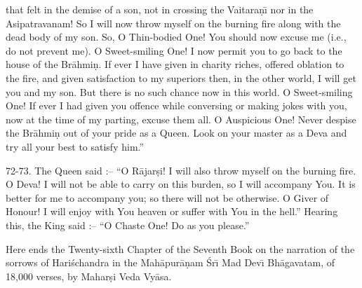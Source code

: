 that felt in the demise of a son, not in crossing the Vaitara\d{n}\={\i} nor in the Asipatravanam! So I will now throw myself on the burning fire along with the dead body of my son. So, O Thin-bodied One! You should now excuse me (i.e., do not prevent me). O Sweet-smiling One! I now permit you to go back to the house of the Br\=ahmi\d{n}. If ever I have given in charity riches, offered oblation to the fire, and given satisfaction to my superiors then, in the other world, I will get you and my son. But there is no such chance now in this world. O Sweet-smiling One! If ever I had given you offence while conversing or making jokes with you, now at the time of my parting, excuse them all. O Auspicious One! Never despise the Br\=ahmi\d{n} out of your pride as a Queen. Look on your master as a Deva and try all your best to satisfy him.''

72-73. The Queen said :-- ``O R\=ajar\d{s}i! I will also throw myself on the burning fire. O Deva! I will not be able to carry on this burden, so I will accompany You. It is better for me to accompany you; so there will not be otherwise. O Giver of Honour! I will enjoy with You heaven or suffer with You in the hell.'' Hearing this, the King said :-- ``O Chaste One! Do as you please.''

Here ends the Twenty-sixth Chapter of the Seventh Book on the narration of the sorrows of Hari\'schandra in the Mah\=apur\=a\d{n}am \'Sr\={\i} Mad Dev\={\i} Bh\=agavatam, of 18,000 verses, by Mahar\d{s}i Veda Vy\=asa.



